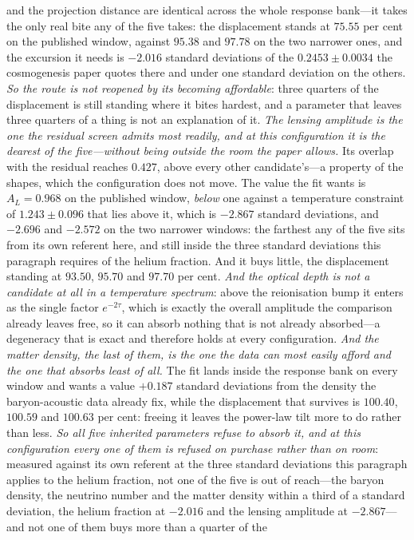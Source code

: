 \documentclass[11pt,a4paper]{article}
\theoremstyle{plain}
\theoremstyle{definition}
\theoremstyle{remark}
\begin{document}
and the projection distance are identical across the whole response bank---it takes the only real bite any of the five takes: the displacement stands at $75.55$ per cent on the published window, against $95.38$ and $97.78$ on the two narrower ones, and the excursion it needs is $-2.016$ standard deviations of the $0.2453\pm0.0034$ the cosmogenesis paper quotes there and under one standard deviation on the others. \emph{So the route is not reopened by its becoming affordable}: three quarters of the displacement is still standing where it bites hardest, and a parameter that leaves three quarters of a thing is not an explanation of it. \emph{The lensing amplitude is the one the residual screen admits most readily, and at this configuration it is the dearest of the five---without being outside the room the paper allows.} Its overlap with the residual reaches $0.427$, above every other candidate's---a property of the shapes, which the configuration does not move. The value the fit wants is $A_L=0.968$ on the published window, \emph{below} one against a temperature constraint of $1.243\pm0.096$ that lies above it, which is $-2.867$ standard deviations, and $-2.696$ and $-2.572$ on the two narrower windows: the farthest any of the five sits from its own referent here, and still inside the three standard deviations this paragraph requires of the helium fraction. And it buys little, the displacement standing at $93.50$, $95.70$ and $97.70$ per cent. \emph{And the optical depth is not a candidate at all in a temperature spectrum}: above the reionisation bump it enters as the single factor $e^{-2\tau}$, which is exactly the overall amplitude the comparison already leaves free, so it can absorb nothing that is not already absorbed---a degeneracy that is exact and therefore holds at every configuration. \emph{And the matter density, the last of them, is the one the data can most easily afford and the one that absorbs least of all.} The fit lands inside the response bank on every window and wants a value $+0.187$ standard deviations from the density the baryon-acoustic data already fix, while the displacement that survives is $100.40$, $100.59$ and $100.63$ per cent: freeing it leaves the power-law tilt more to do rather than less. \emph{So all five inherited parameters refuse to absorb it, and at this configuration every one of them is refused on purchase rather than on room}: measured against its own referent at the three standard deviations this paragraph applies to the helium fraction, not one of the five is out of reach---the baryon density, the neutrino number and the matter density within a third of a standard deviation, the helium fraction at $-2.016$ and the lensing amplitude at $-2.867$---and not one of them buys more than a quarter of the 
\end{document}
